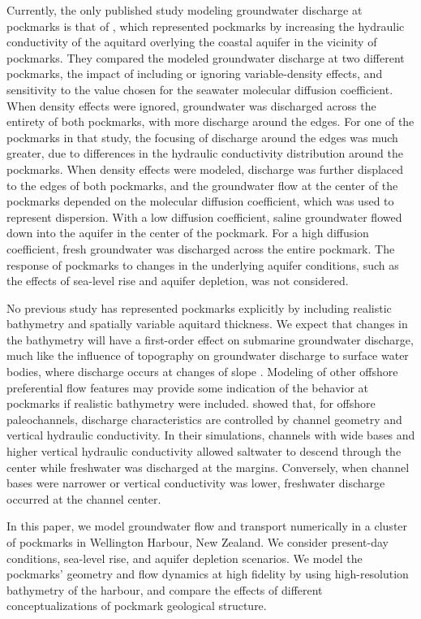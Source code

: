 \documentclass[draft, 10pt]{agujournal2019}
\begin{document}
Currently, the only published study modeling groundwater discharge at pockmarks is that of ,
which represented pockmarks by increasing the hydraulic conductivity of the aquitard overlying the coastal aquifer in the vicinity of pockmarks.
They compared the modeled groundwater discharge at two different pockmarks, the impact of including or ignoring variable-density effects,
and sensitivity to the value chosen for the seawater molecular diffusion coefficient.
When density effects were ignored, groundwater was discharged across the entirety of both pockmarks, with more discharge around the edges.
For one of the pockmarks in that study, the focusing of discharge around the edges was much greater, due to differences in the hydraulic conductivity distribution around the pockmarks.
When density effects were modeled, discharge was further displaced to the edges of both pockmarks, and the groundwater flow at the center of the pockmarks depended on the molecular diffusion coefficient, which was used to represent dispersion.
With a low diffusion coefficient, saline groundwater flowed down into the aquifer in the center of the pockmark.
For a high diffusion coefficient, fresh groundwater was discharged across the entire pockmark.
The response of pockmarks to changes in the underlying aquifer conditions, such as the effects of sea-level rise and aquifer depletion, was not considered.

No previous study has represented pockmarks explicitly by including realistic bathymetry and spatially variable aquitard thickness.
We expect that changes in the bathymetry will have a first-order effect on submarine groundwater discharge,
much like the influence of topography on groundwater discharge to surface water bodies, where discharge occurs at changes of slope \cite{winter_relation_1999}.
Modeling of other offshore preferential flow features may provide some indication of the behavior at pockmarks if realistic bathymetry were included.
 showed that, for offshore paleochannels, discharge characteristics are controlled by channel geometry and vertical hydraulic conductivity.
In their simulations, channels with wide bases and higher vertical hydraulic conductivity allowed saltwater to descend through the center while freshwater was discharged at the margins.
Conversely, when channel bases were narrower or vertical conductivity was lower, freshwater discharge occurred at the channel center.

In this paper, we model groundwater flow and transport numerically in a cluster of pockmarks in Wellington Harbour, New Zealand.
We consider present-day conditions, sea-level rise, and aquifer depletion scenarios.
We model the pockmarks' geometry and flow dynamics at high fidelity by using high-resolution bathymetry of the harbour,
and compare the effects of different conceptualizations of pockmark geological structure.
\end{document}
